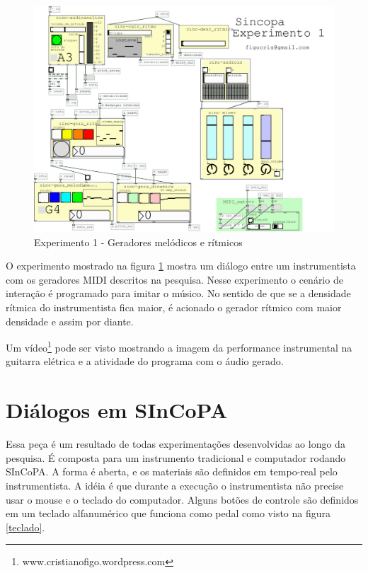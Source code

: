 \documentclass[draft]{ppgmus}
\begin{document}
\begin{figure}
\includegraphics[scale=.6]{experimento1}
\caption{Experimento 1 - Geradores melódicos e rítmicos}
\label{experimento1}
\end{figure}


O experimento mostrado na figura \ref{experimento1} mostra um diálogo
entre um instrumentista com os geradores MIDI descritos na pesquisa.
Nesse experimento o cenário de interação é programado para imitar
o músico. No sentido de que se a densidade rítmica do instrumentista fica maior,
é acionado o gerador rítmico com maior densidade e assim por diante.

Um vídeo\footnote{www.cristianofigo.wordpress.com} pode ser visto mostrando a imagem da performance instrumental
na guitarra elétrica e a atividade do programa com o áudio gerado.



\section{Diálogos em SInCoPA}

Essa peça é um resultado de todas experimentações desenvolvidas ao longo da pesquisa. É
composta para um instrumento tradicional e computador rodando SInCoPA. A forma é aberta,
e os materiais são definidos em tempo-real pelo instrumentista. A idéia é que durante a
execução o instrumentista não precise usar o mouse e o teclado do 
computador. Alguns botões de controle são definidos em um teclado alfanumérico que funciona como
pedal como visto na figura \ref{teclado}.
\end{document}
